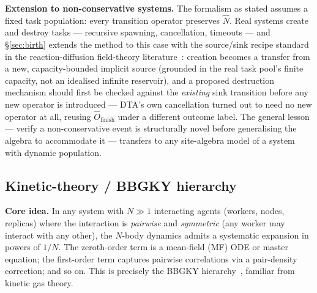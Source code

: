 \documentclass[11pt,a4paper]{report}
\begin{document}
\medskip
\noindent\textbf{Extension to non-conservative systems.}
The formalism as stated assumes a fixed task population: every
transition operator preserves $\hat N$. Real systems create and
destroy tasks --- recursive spawning, cancellation, timeouts ---
and \S\ref{sec:birth} extends the method to this case with the
source/sink recipe standard in the reaction-diffusion field-theory
literature~\cite{doi1976,peliti1985,tauber2005}: creation becomes a
transfer from a new, capacity-bounded implicit source (grounded in the
real task pool's finite capacity, not an idealised infinite reservoir),
and a proposed destruction mechanism should first be checked against
the \emph{existing} sink transition before any new operator is
introduced --- DTA's own cancellation turned out to need no new
operator at all, reusing $\hat O_{\text{finish}}$ under a different
outcome label. The general lesson --- verify a non-conservative event
is structurally novel before generalising the algebra to accommodate
it --- transfers to any site-algebra model of a system with dynamic
population.

\subsection{Kinetic-theory / BBGKY hierarchy}

\medskip
\noindent\textbf{Core idea.}
In any system with $N \gg 1$ interacting agents (workers, nodes, replicas)
where the interaction is \emph{pairwise} and \emph{symmetric} (any worker
may interact with any other), the $N$-body dynamics admits a systematic
expansion in powers of $1/N$.  The zeroth-order term is a mean-field (MF)
ODE or master equation; the first-order term captures pairwise correlations
via a pair-density correction; and so on.  This is precisely the BBGKY
hierarchy~\cite{bogoliubov1946,born_green1949,kirkwood1946,yvon1935},
familiar from kinetic gas theory.
\end{document}
